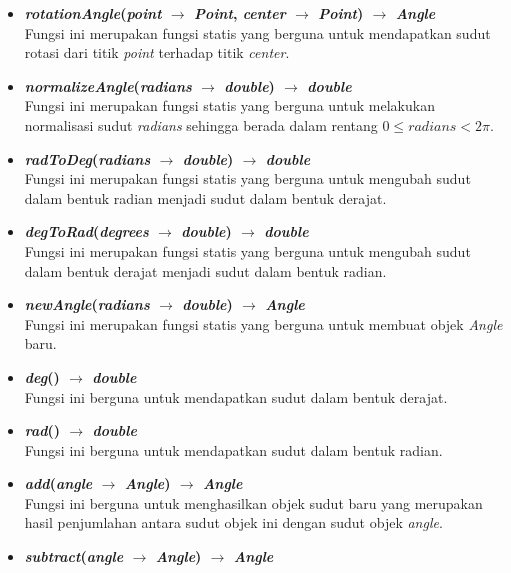 \begin{itemize}
	\item \textbf{\textit{rotationAngle}(\textit{point} \(\rightarrow\) \textit{Point}, \textit{center} \(\rightarrow\) \textit{Point}) \(\rightarrow\) \textit{Angle}}\\
	Fungsi ini merupakan fungsi statis yang berguna untuk mendapatkan sudut rotasi dari titik \textit{point} terhadap titik \textit{center}.
	\item \textbf{\textit{normalizeAngle}(\textit{radians} \(\rightarrow\) \textit{double}) \(\rightarrow\) \textit{double}}\\
	Fungsi ini merupakan fungsi statis yang berguna untuk melakukan normalisasi sudut \textit{radians} sehingga berada dalam rentang \(0\leq\textit{radians}<2\pi\).
	\item \textbf{\textit{radToDeg}(\textit{radians} \(\rightarrow\) \textit{double}) \(\rightarrow\) \textit{double}}\\
	Fungsi ini merupakan fungsi statis yang berguna untuk mengubah sudut dalam bentuk radian menjadi sudut dalam bentuk derajat.
	\item \textbf{\textit{degToRad}(\textit{degrees} \(\rightarrow\) \textit{double}) \(\rightarrow\) \textit{double}}\\
	Fungsi ini merupakan fungsi statis yang berguna untuk mengubah sudut dalam bentuk derajat menjadi sudut dalam bentuk radian.
	\item \textbf{\textit{newAngle}(\textit{radians} \(\rightarrow\) \textit{double}) \(\rightarrow\) \textit{Angle}}\\
	Fungsi ini merupakan fungsi statis yang berguna untuk membuat objek \textit{Angle} baru.
	\item \textbf{\textit{deg}() \(\rightarrow\) \textit{double}}\\
	Fungsi ini berguna untuk mendapatkan sudut dalam bentuk derajat.
	\item \textbf{\textit{rad}() \(\rightarrow\) \textit{double}}\\
	Fungsi ini berguna untuk mendapatkan sudut dalam bentuk radian.
	\item \textbf{\textit{add}(\textit{angle} \(\rightarrow\) \textit{Angle}) \(\rightarrow\) \textit{Angle}}\\
	Fungsi ini berguna untuk menghasilkan objek sudut baru yang merupakan hasil penjumlahan antara sudut objek ini dengan sudut objek \textit{angle}.
	\item \textbf{\textit{subtract}(\textit{angle} \(\rightarrow\) \textit{Angle}) \(\rightarrow\) \textit{Angle}}\\

\end{itemize}
